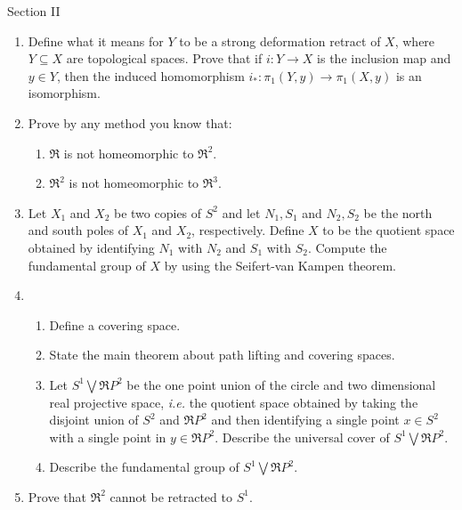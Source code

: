 \newpage

\noindent Section II

\begin{enumerate}

\item Define what it means for $Y$ to be a strong deformation retract of
        $X$, where $Y \subseteq X$ are topological spaces. Prove that if
        $i : Y \rightarrow X$ is the inclusion map and $y \in Y$, then
        the induced homomorphism 
        $i_{*}: \pi_{1} (Y,y) \rightarrow \pi_{1} (X,y)$
        is an isomorphism.

\item Prove by any method you know that:
        \begin{enumerate}
            \item $\Re $ is not homeomorphic to $\Re^{2}$.
            \item $\Re^{2}$ is not homeomorphic to $\Re^{3}$.
        \end{enumerate}

\item Let $X_{1}$ and $X_{2}$ be two copies of $S^{2}$ and let $N_{1},
        S_{1}$ and $N_{2}, S_{2}$ be the north and south poles of $X_{1}$ and
        $X_{2}$, respectively. Define $X$ to be the quotient space obtained by
        identifying $N_{1}$ with $N_{2}$ and $S_{1}$ with $S_{2}$. Compute
        the fundamental group of $X$ by using the Seifert-van Kampen theorem.

\item \begin{enumerate}
        \item Define a covering space.
        \item State the main theorem about path lifting and covering
                spaces.
        \item Let $S^{1} \bigvee \Re P^{2}$ be the one point union of the
                circle and two dimensional real projective space, {\it i.e.}
                the quotient space obtained by taking the disjoint union
                of $S^{2}$ and $\Re P^{2}$ and then identifying a single point
                $x \in S^{2}$ with a single point in $ y \in \Re P^{2}$. 
                Describe the universal cover of $S^{1} \bigvee \Re P^{2}$.
        \item Describe the fundamental group of $S^{1} \bigvee \Re P^{2}$.
      \end{enumerate}

\item Prove that $\Re^{2}$ cannot be retracted to $S^{1}$. 
\end{enumerate}











